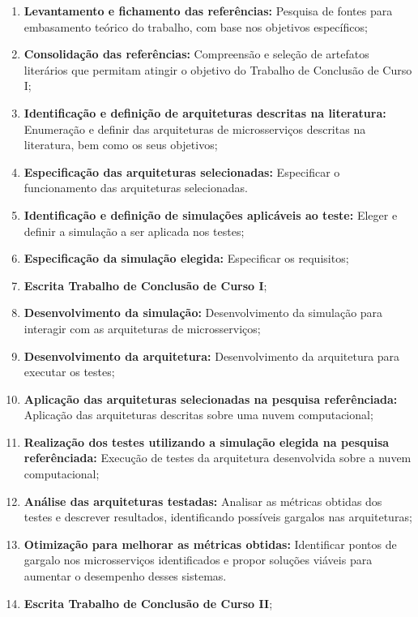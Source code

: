 \begin{enumerate}
  \item \textbf{Levantamento e fichamento das referências:} Pesquisa de fontes para embasamento teórico do trabalho, com base nos objetivos específicos;

  \item \textbf{Consolidação das referências:} Compreensão e seleção de artefatos literários que permitam atingir o objetivo do Trabalho de Conclusão de Curso I;

  \item \textbf{Identificação e definição de arquiteturas descritas na literatura:} Enumeração e definir das arquiteturas de microsserviços descritas na literatura, bem como os seus objetivos;

  \item \textbf{Especificação das arquiteturas selecionadas:} Especificar o funcionamento das arquiteturas selecionadas.

  \item \textbf{Identificação e definição de simulações aplicáveis ao teste:} Eleger e definir a simulação a ser aplicada nos testes;

  \item \textbf{Especificação da simulação elegida:} Especificar os requisitos;

  \item \textbf{Escrita Trabalho de Conclusão de Curso I};

  \item \textbf{Desenvolvimento da simulação:} Desenvolvimento da simulação para interagir com as arquiteturas de microsserviços;

  \item \textbf{Desenvolvimento da arquitetura:} Desenvolvimento da arquitetura para executar os testes;

  \item \textbf{Aplicação das arquiteturas selecionadas na pesquisa referênciada:} Aplicação das arquiteturas descritas sobre uma nuvem computacional;

  \item \textbf{Realização dos testes utilizando a simulação elegida na pesquisa referênciada:} Execução de testes da arquitetura desenvolvida sobre a nuvem computacional;

  \item \textbf{Análise das arquiteturas testadas:} Analisar as métricas obtidas dos testes e descrever resultados, identificando possíveis gargalos nas arquiteturas;

  \item \textbf{Otimização para melhorar as métricas obtidas:} Identificar pontos de gargalo nos microsserviços identificados e propor soluções viáveis para aumentar o desempenho desses sistemas.

  \item \textbf{Escrita Trabalho de Conclusão de Curso II};
\end{enumerate}
